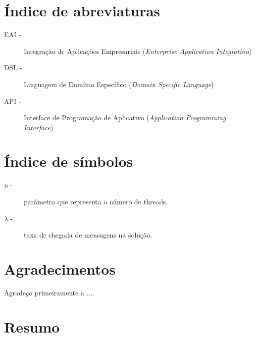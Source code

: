 \documentclass[final]{rc-book-2.14}
\begin{document}


\makefront 
    
\chapter{Índice de abreviaturas}
\label{app-acronym}

\begin{description}
    \item[EAI -] Integração de Aplicações Empresariais (\textit{Enterprise Application Integration})
    \item[DSL -] Linguagem de Domínio Específico (\textit{Domain Specific Language})
    \item[API -] Interface de Programação de Aplicativo (\textit{Application Programming Interface})
\end{description}
    

\chapter{Índice de símbolos}
\label{app-acronym}

\begin{description}
	\item[ \textit{n} -] parâmetro que representa o número de threads.
	\item[ $\lambda$ -] taxa de chegada de mensagens na solução.
\end{description}
    

\chapter{Agradecimentos}
\label{chp:acknowledgements}

\drop Agradeço primeiramente a ....
    


\chapter{Resumo}
\label{chp:general-abstract:portuguese}
\end{document}
